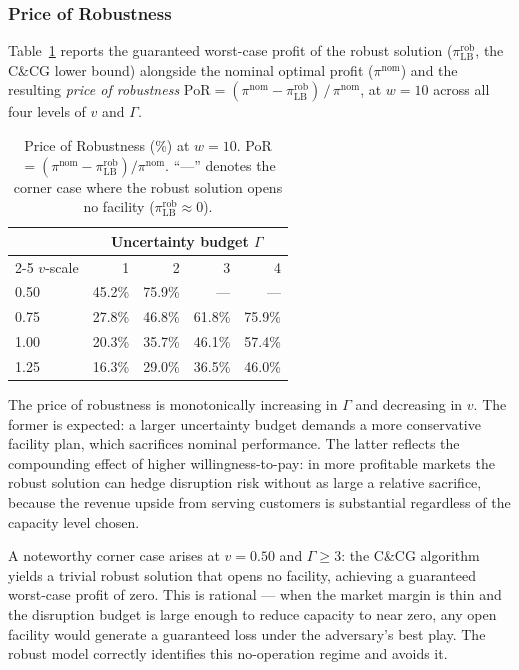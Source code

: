 \subsubsection*{Price of Robustness}

Table~\ref{tab:price_of_robustness} reports the guaranteed worst-case
profit of the robust solution ($\pi^{\mathrm{rob}}_{\mathrm{LB}}$, the
C\&CG lower bound) alongside the nominal optimal profit
($\pi^{\mathrm{nom}}$) and the resulting \emph{price of robustness}
$\text{PoR} = (\pi^{\mathrm{nom}} - \pi^{\mathrm{rob}}_{\mathrm{LB}})\,/\,\pi^{\mathrm{nom}}$,
at $w = 10$ across all four levels of $v$ and $\Gamma$.

\begin{table}[htbp]
\centering
\caption{Price of Robustness (\%) at $w = 10$.
         PoR$= (\pi^{\mathrm{nom}} - \pi^{\mathrm{rob}}_{\mathrm{LB}})/\pi^{\mathrm{nom}}$.
         ``—'' denotes the corner case where the robust solution opens
         no facility ($\pi^{\mathrm{rob}}_{\mathrm{LB}} \approx 0$).}
\label{tab:price_of_robustness}
\setlength{\tabcolsep}{6pt}
\begin{tabular}{lrrrr}
\toprule
& \multicolumn{4}{c}{Uncertainty budget $\Gamma$} \\
\cmidrule(lr){2-5}
$v$-scale & 1 & 2 & 3 & 4 \\
\midrule
0.50 & 45.2\% & 75.9\% & —   & —    \\
0.75 & 27.8\% & 46.8\% & 61.8\% & 75.9\% \\
1.00 & 20.3\% & 35.7\% & 46.1\% & 57.4\% \\
1.25 & 16.3\% & 29.0\% & 36.5\% & 46.0\% \\
\bottomrule
\end{tabular}
\end{table}

The price of robustness is monotonically increasing in $\Gamma$ and
decreasing in $v$.  The former is expected: a larger uncertainty budget
demands a more conservative facility plan, which sacrifices nominal
performance.  The latter reflects the compounding effect of higher
willingness-to-pay: in more profitable markets the robust solution can
hedge disruption risk without as large a relative sacrifice, because the
revenue upside from serving customers is substantial regardless of the
capacity level chosen.

A noteworthy corner case arises at $v = 0.50$ and $\Gamma \geq 3$:
the C\&CG algorithm yields a trivial robust solution that opens no
facility, achieving a guaranteed worst-case profit of zero.  This is
rational — when the market margin is thin and the disruption budget is
large enough to reduce capacity to near zero, any open facility would
generate a guaranteed loss under the adversary's best play.
The robust model correctly identifies this no-operation regime and
avoids it.

